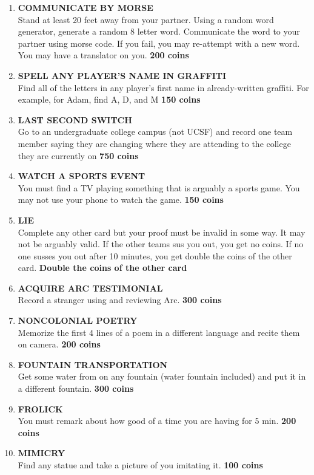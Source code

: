 \documentclass{article}
\begin{document}
\begin{enumerate}
    \item \textbf{COMMUNICATE BY MORSE} \\ Stand at least 20 feet away from your partner. Using a random word generator, generate a random 8 letter word. Communicate the word to your partner using morse code. If you fail, you may re-attempt with a new word. You may have a translator on you. \textbf{200 coins}
    \item \textbf{SPELL ANY PLAYER'S NAME IN GRAFFITI} \\ Find all of the letters in any player's first name in already-written graffiti. For example, for Adam, find A, D, and M \textbf{150 coins}
    \item \textbf{LAST SECOND SWITCH} \\
    Go to an undergraduate college campus (not UCSF) and record one team member saying they are changing where they are attending to the college they are currently on \textbf{750 coins}
    \item \textbf{WATCH A SPORTS EVENT} \\You must find a TV playing something that is arguably a sports game. You may not use your phone to watch the game. \textbf{150 coins}
    \item \textbf{LIE} \\ Complete any other card but your proof must be invalid in some way. It may not be arguably valid. If the other teams sus you out, you get no coins. If no one susses you out after 10 minutes, you get double the coins of the other card. \textbf{Double the coins of the other card}
    \item \textbf{ACQUIRE ARC TESTIMONIAL} \\  Record a stranger using and reviewing Arc. \textbf{300 coins}
    \item \textbf{NONCOLONIAL POETRY} \\ Memorize the first 4 lines of a poem in a different language and recite them on camera. \textbf{200 coins}
    \item \textbf{FOUNTAIN TRANSPORTATION} \\Get some water from on any fountain (water fountain included) and put it in a different fountain. \textbf{300 coins}
    \item \textbf{FROLICK} \\ You must remark about how good of a time you are having for 5 min. \textbf{200 coins}
    \item \textbf{MIMICRY}\\ Find any statue and take a picture of you imitating it. \textbf{100 coins}

\end{enumerate}
\end{document}
